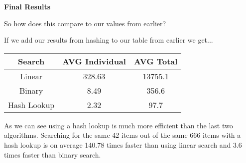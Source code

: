 \documentclass[12pt,letterpaper, onecolumn]{exam}
\begin{document}
\newpage
\centering\textbf{Final Results}

\vspace{.8cm}

\centering So how does this compare to our values from earlier?

\vspace{.7cm}

\centering If we add our results from hashing to our table from earlier we get...

\vspace{.4cm}

\begin{tabular}{|c|c|c|}
    \hline
          \textbf{Search} & \textbf{AVG Individual} & \textbf{AVG Total} \\
          \hline
         Linear  & 328.63 & 13755.1 \\
         Binary  & 8.49 & 356.6 \\
         Hash Lookup & 2.32 & 97.7 \\
         
    \hline
    \end{tabular}

    \vspace{.8cm}

\centering As we can see using a hash lookup is much more efficient than the last two algorithms. Searching for the same 42 items out of the same 666 items with a hash lookup is on average 140.78 times faster than using linear search and 3.6 times faster than binary search.
\end{document}
